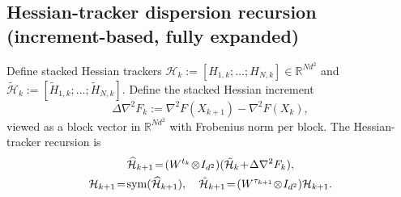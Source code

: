 \documentclass[10pt,twocolumn,letterpaper]{article}
\theoremstyle{compact}
\theoremstyle{compactremark}
\newcommand{\R}{\mathbb{R}}
\begin{document}
\subsection{Hessian-tracker dispersion recursion (increment-based, fully expanded)}

Define stacked Hessian trackers $\mathcal H_k:=[H_{1,k};\dots;H_{N,k}]\in\R^{Nd^2}$ and
$\tilde{\mathcal H}_k:=[\tilde H_{1,k};\dots;\tilde H_{N,k}]$.
Define the stacked Hessian increment
\[
\Delta\nabla^2 F_k:=\nabla^2 F(X_{k+1})-\nabla^2 F(X_k),
\]
viewed as a block vector in $\R^{Nd^2}$ with Frobenius norm per block.
The Hessian-tracker recursion is
\begin{gather}
\widehat{\mathcal H}_{k+1}\!=\!(W^{t_k}\!\otimes\! I_{d^2})(\tilde{\mathcal H}_k\!+\!\Delta\nabla^2 F_k),\label{eq:H_update_stack}\\
\mathcal H_{k+1}\!=\!\mathrm{sym}(\widehat{\mathcal H}_{k+1}),\quad
\tilde{\mathcal H}_{k+1}\!=\!(W^{\tau_{k+1}}\!\otimes\! I_{d^2})\mathcal H_{k+1}.\notag
\end{gather}
\end{document}
